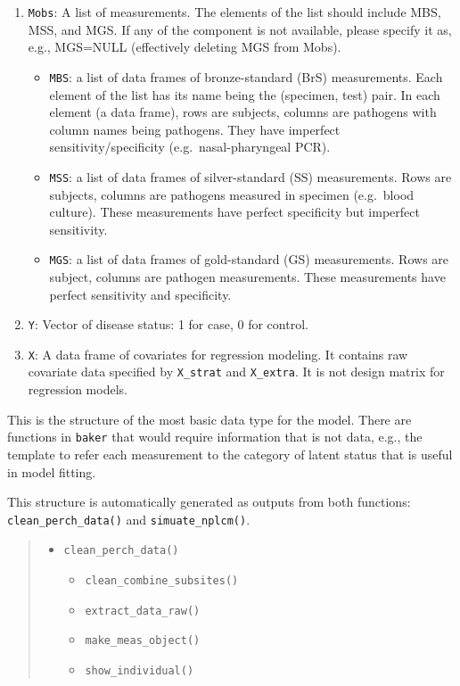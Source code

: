 \documentclass[article]{jss}
\begin{document}
\begin{enumerate}
\def\labelenumi{\arabic{enumi}.}
\itemsep1pt\parskip0pt
\item
  \texttt{Mobs}: A list of measurements. The elements of the list should
  include MBS, MSS, and MGS. If any of the component is not available,
  please specify it as, e.g., MGS=NULL (effectively deleting MGS from
  Mobs).

  \begin{itemize}
  \itemsep1pt\parskip0pt
  \item
    \texttt{MBS}: a list of data frames of bronze-standard (BrS)
    measurements. Each element of the list has its name being the
    (specimen, test) pair. In each element (a data frame), rows are
    subjects, columns are pathogens with column names being pathogens.
    They have imperfect sensitivity/specificity (e.g.~nasal-pharyngeal
    PCR).
  \item
    \texttt{MSS}: a list of data frames of silver-standard (SS)
    measurements. Rows are subjects, columns are pathogens measured in
    specimen (e.g.~blood culture). These measurements have perfect
    specificity but imperfect sensitivity.
  \item
    \texttt{MGS}: a list of data frames of gold-standard (GS)
    measurements. Rows are subject, columns are pathogen measurements.
    These measurements have perfect sensitivity and specificity.
  \end{itemize}
\item
  \texttt{Y}: Vector of disease status: 1 for case, 0 for control.
\item
  \texttt{X}: A data frame of covariates for regression modeling. It
  contains raw covariate data specified by \texttt{X\_strat} and
  \texttt{X\_extra}. It is not design matrix for regression models.
\end{enumerate}

This is the structure of the most basic data type for the model. There
are functions in \texttt{baker} that would require information that is
not data, e.g., the template to refer each measurement to the category
of latent status that is useful in model fitting.

This structure is automatically generated as outputs from both
functions: \texttt{clean\_perch\_data()} and \texttt{simuate\_nplcm()}.

\begin{quote}
\begin{itemize}
\itemsep1pt\parskip0pt
\item
  \texttt{clean\_perch\_data()}

  \begin{itemize}
  \itemsep1pt\parskip0pt
  \item
    \texttt{clean\_combine\_subsites()}
  \item
    \texttt{extract\_data\_raw()}
  \item
    \texttt{make\_meas\_object()}
  \item
    \texttt{show\_individual()}
  \end{itemize}
\end{itemize}
\end{quote}
\end{document}

